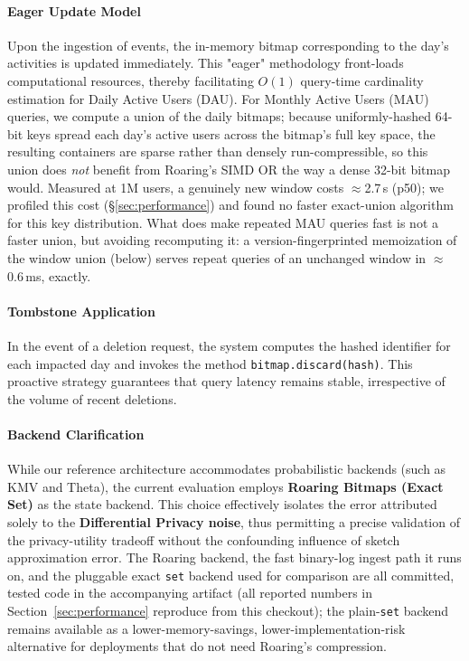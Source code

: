\documentclass[sigconf,anonymous,review]{acmart}
\begin{document}
\paragraph{Eager Update Model} Upon the ingestion of events, the in-memory bitmap corresponding to the day's activities is updated immediately. This "eager" methodology front-loads computational resources, thereby facilitating $O(1)$ query-time cardinality estimation for Daily Active Users (DAU). For Monthly Active Users (MAU) queries, we compute a union of the daily bitmaps; because uniformly-hashed 64-bit keys spread each day's active users across the bitmap's full key space, the resulting containers are sparse rather than densely run-compressible, so this union does \emph{not} benefit from Roaring's SIMD OR the way a dense 32-bit bitmap would. Measured at 1M users, a genuinely new window costs $\approx$2.7\,s (p50); we profiled this cost (\S\ref{sec:performance}) and found no faster exact-union algorithm for this key distribution. What does make repeated MAU queries fast is not a faster union, but avoiding recomputing it: a version-fingerprinted memoization of the window union (below) serves repeat queries of an unchanged window in $\approx$0.6\,ms, exactly.

\paragraph{Tombstone Application} In the event of a deletion request, the system computes the hashed identifier for each impacted day and invokes the method \texttt{bitmap.discard(hash)}. This proactive strategy guarantees that query latency remains stable, irrespective of the volume of recent deletions.

\paragraph{Backend Clarification} While our reference architecture accommodates probabilistic backends (such as KMV and Theta), the current evaluation employs \textbf{Roaring Bitmaps (Exact Set)} as the state backend. This choice effectively isolates the error attributed solely to the \textbf{Differential Privacy noise}, thus permitting a precise validation of the privacy-utility tradeoff without the confounding influence of sketch approximation error. The Roaring backend, the fast binary-log ingest path it runs on, and the pluggable exact \texttt{set} backend used for comparison are all committed, tested code in the accompanying artifact (all reported numbers in Section~\ref{sec:performance} reproduce from this checkout); the plain-\texttt{set} backend remains available as a lower-memory-savings, lower-implementation-risk alternative for deployments that do not need Roaring's compression.
\end{document}
